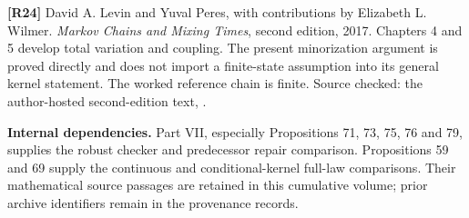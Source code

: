\documentclass[11pt,oneside,openany]{book}
\numberwithin{equation}{section}
\begin{document}
\textbf{{[}R24{]}} David A. Levin and Yuval Peres, with contributions by
Elizabeth L. Wilmer. \emph{Markov Chains and Mixing Times}, second
edition, 2017. Chapters 4 and 5 develop total variation and coupling.
The present minorization argument is proved directly and does not import
a finite-state assumption into its general kernel statement. The worked
reference chain is finite. Source checked: the author-hosted
second-edition text,
.

\textbf{Internal dependencies.} Part VII, especially Propositions 71,
73, 75, 76 and 79, supplies the robust checker and predecessor repair
comparison. Propositions 59 and 69 supply the continuous and
conditional-kernel full-law comparisons. Their mathematical source
passages are retained in this cumulative volume; prior archive
identifiers remain in the provenance records.

\endgroup
\end{document}
